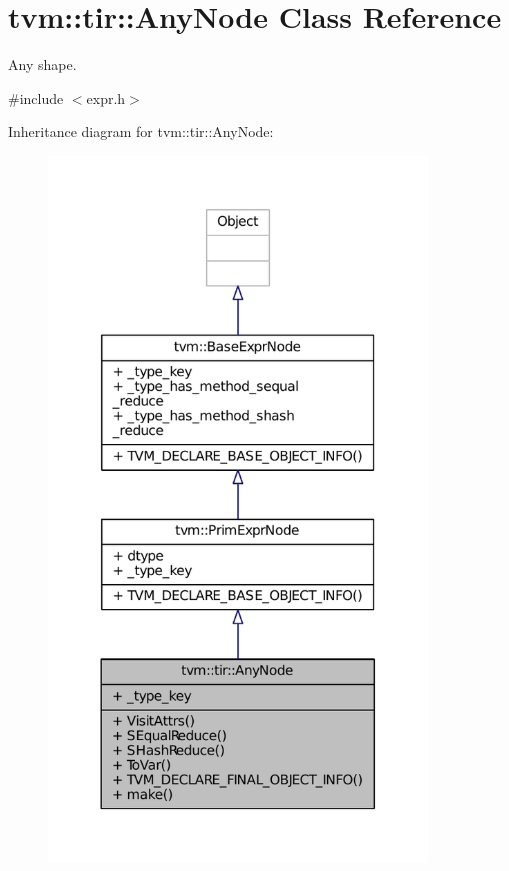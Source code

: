 \hypertarget{classtvm_1_1tir_1_1AnyNode}{}\section{tvm\+:\+:tir\+:\+:Any\+Node Class Reference}
\label{classtvm_1_1tir_1_1AnyNode}


Any shape.  




{\ttfamily \#include $<$expr.\+h$>$}



Inheritance diagram for tvm\+:\+:tir\+:\+:Any\+Node\+:
\nopagebreak
\begin{figure}[H]
\begin{center}
\leavevmode
\includegraphics[width=285pt]{classtvm_1_1tir_1_1AnyNode__inherit__graph}
\end{center}
\end{figure}


